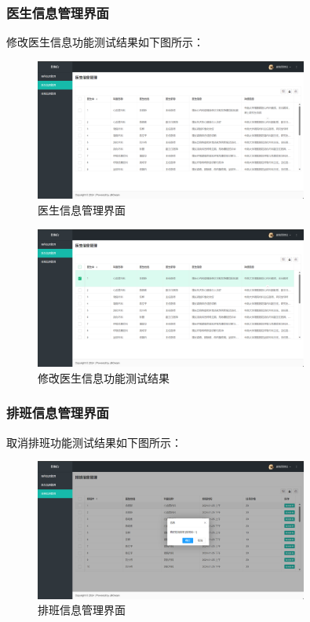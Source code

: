 \documentclass[UTF8,12pt]{article}
\begin{document}
\newpage

\subsubsection{医生信息管理界面}
修改医生信息功能测试结果如下图所示：

\begin{figure}[htbp]
    \centering
    \includegraphics[width=0.8\textwidth]{imgs/37.png}
    \caption{医生信息管理界面}
\end{figure}

\begin{figure}[htbp]
    \centering
    \includegraphics[width=0.8\textwidth]{imgs/38.png}
    \caption{修改医生信息功能测试结果}
\end{figure}

\newpage

\subsubsection{排班信息管理界面}
取消排班功能测试结果如下图所示：

\begin{figure}[htbp]
    \centering
    \includegraphics[width=0.8\textwidth]{imgs/39.png}
    \caption{排班信息管理界面}
\end{figure}
\end{document}
